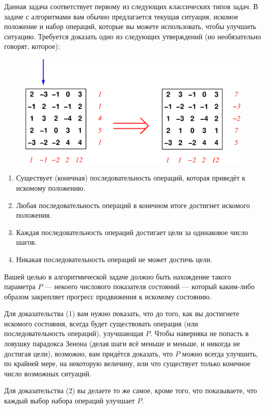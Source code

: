 Данная задача соответствует первому из следующих классических типов задач.
В задаче с алгоритмами вам обычно предлагается текущая ситуация, искомое положение и набор операций, которые вы можете использовать, чтобы улучшить ситуацию.
Требуется доказать одно из следующих утверждений (но необязательно говорят, которое):
\begin{figure}
\centering
\includegraphics[scale=0.6]{Figs/Algorithms/array}
\end{figure}
\begin{enumerate}[(1)]
\item Существует (конечная) последовательность операций, которая приведёт к искомому положению.
\item Любая последовательность операций в конечном итоге достигнет искомого положения.
\item Каждая последовательность операций достигает цели за одинаковое число шагов.
\item Никакая последовательность операций не может достичь цели.
\end{enumerate}

Вашей целью в алгоритмической задаче должно быть нахождение такого параметра $P$ --- некоего числового показателя состояний --- который каким-либо образом закрепляет прогресс продвижения к искомому состоянию.

Для доказательства (1) вам нужно показать, что до того, как вы достигнете искомого состояния, всегда будет существовать операция (или последовательность операций), улучшающая $P$.
Чтобы наверняка не попасть в ловушку парадокса Зенона (делая шаги всё меньше и меньше, и никогда не достигая цели), возможно, вам придётся доказать, что $P$ можно всегда улучшить, по крайней мере, на некоторую величину, или что существует только конечное число возможных ситуаций.

Для доказательства (2) вы делаете то же самое, кроме того, что показываете, что каждый выбор набора операций улучшает $P$.

